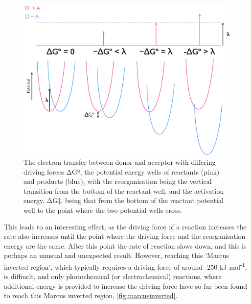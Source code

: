 \documentclass[
]{book}
\begin{document}
\begin{figure}

{\centering \includegraphics[width=1\linewidth]{images/marcus} 

}

\caption{The electron transfer between donor and acceptor with differing driving forces ΔGº, the potential energy wells of reactants (pink) and products (blue), with the reorganisation being the vertical transition from the bottom of the reactant well, and the activation energy, ΔG‡, being that from the bottom of the reactant potential well to the point where the two potential wells cross.}\label{fig:marcus}
\end{figure}

This leads to an interesting effect, as the driving force of a reaction increases the rate also increases until the point where the driving force and the reorganisation energy are the same. After this point the rate of reaction slows down, and this is perhaps an unusual and unexpected result. However, reaching this `Marcus inverted region', which typically requires a driving force of around -250 kJ mol\textsuperscript{-1}, is diffiuclt, and only photochemical (or electrochemical) reactions, where additional energy is provided to increase the driving force have so far been found to reach this Marcus inverted region, \ref{fig:marcusinverted}.
\end{document}
